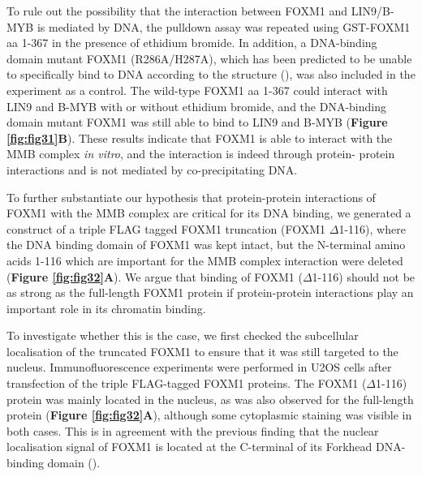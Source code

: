 To rule out the possibility that the interaction between FOXM1 and LIN9/B-MYB is mediated by DNA, the pulldown assay was repeated using GST-FOXM1 aa 1-367 in the presence of ethidium bromide. In addition, a DNA-binding domain mutant FOXM1 (R286A/H287A), which has been predicted to be unable to specifically bind to DNA according to the structure (\cite{littler2010structure}), was also included in the experiment as a control. The wild-type FOXM1 aa 1-367 could interact with LIN9 and B-MYB with or without ethidium bromide, and the DNA-binding domain mutant FOXM1 was still able to bind to LIN9 and B-MYB (\textbf{Figure \ref{fig:fig31}B}). These results indicate that FOXM1 is able to interact with the MMB complex \textit{in vitro}, and the interaction is indeed through protein- protein interactions and is not mediated by co-precipitating DNA.

To further substantiate our hypothesis that protein-protein interactions of FOXM1 with the MMB complex are critical for its DNA binding, we generated a construct of a triple FLAG tagged FOXM1 truncation (FOXM1 $\Delta$1-116), where the DNA binding domain of FOXM1 was kept intact, but the N-terminal amino acids 1-116 which are important for the MMB complex interaction were deleted (\textbf{Figure \ref{fig:fig32}A}). We argue that binding of FOXM1 ($\Delta$1-116) should not be as strong as the full-length FOXM1 protein if protein-protein interactions play an important role in its chromatin binding.

To investigate whether this is the case, we first checked the subcellular localisation of the truncated FOXM1 to ensure that it was still targeted to the nucleus. Immunofluorescence experiments were performed in U2OS cells after transfection of the triple FLAG-tagged FOXM1 proteins. The FOXM1 ($\Delta$1-116) protein was mainly located in the nucleus, as was also observed for the full-length protein (\textbf{Figure \ref{fig:fig32}A}), although some cytoplasmic staining was visible in both cases. This is in agreement with the previous finding that the nuclear localisation signal of FOXM1 is located at the C-terminal of its Forkhead DNA-binding domain (\cite{zhang2011foxm1}).

